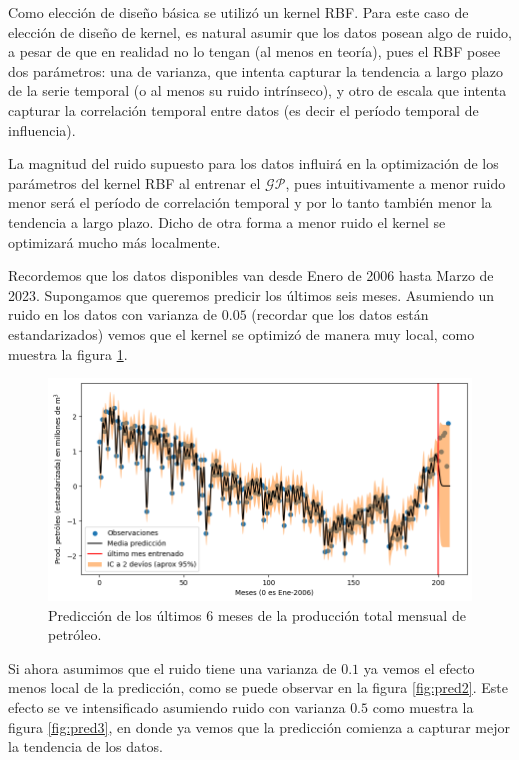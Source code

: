 \documentclass[a4paper]{article}
\newcommand{\gp}{\ensuremath{\mathcal{GP}}}
\begin{document}
Como elección de diseño básica se utilizó un kernel RBF. Para este caso de elección de diseño de kernel, es natural asumir que los datos posean algo de ruido, a pesar de que en realidad no lo tengan (al menos en teoría), pues el RBF posee dos parámetros: una de varianza, que intenta capturar la tendencia a largo plazo de la serie temporal (o al menos su ruido intrínseco), y otro de escala que intenta capturar la correlación temporal entre datos (es decir el período temporal de influencia).

La magnitud del ruido supuesto para los datos influirá en la optimización de los parámetros del kernel RBF al entrenar el $\gp$, pues intuitivamente a menor ruido menor será el período de correlación temporal y por lo tanto también menor la tendencia a largo plazo. Dicho de otra forma a menor ruido el kernel se optimizará mucho más localmente.

Recordemos que los datos disponibles van desde Enero de 2006 hasta Marzo de 2023. Supongamos que queremos predicir los últimos seis meses. Asumiendo un ruido en los datos con varianza de $0.05$ (recordar que los datos están estandarizados) vemos que el kernel se optimizó de manera muy local, como muestra la figura \ref{fig:pred1}.

\begin{figure}[h]
	\centering
	\includegraphics[trim={0cm 0cm 0cm 0cm},clip,width=.9\textwidth]{pred1.png}
	\caption{Predicción de los últimos 6 meses de la producción total mensual de petróleo.}
	\label{fig:pred1}
\end{figure}

Si ahora asumimos que el ruido tiene una varianza de $0.1$ ya vemos el efecto menos local de la predicción, como se puede observar en la figura \ref{fig:pred2}. Este efecto se ve intensificado asumiendo ruido con varianza $0.5$ como muestra la figura \ref{fig:pred3}, en donde ya vemos que la predicción comienza a capturar mejor la tendencia de los datos.
\end{document}
